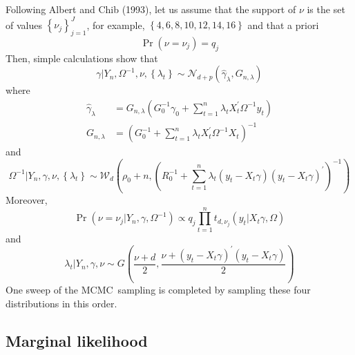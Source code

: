 \documentclass[12pt]{article}
\begin{document}
Following Albert and Chib (1993), let us assume that the support of $\nu $
is the set of values $\left\{ \nu _{j}\right\} _{j=1}^{J}$, for example, $%
\left\{ 4,6,8,10,12,14,16\right\} $ and that a priori
\begin{equation*}
\Pr \left( \nu =\nu _{j}\right) =q_{j}
\end{equation*}%
Then, simple calculations show that
\begin{equation*}
\gamma |Y_{n},\Omega ^{-1},\nu ,\left\{ \lambda _{t}\right\} \sim \mathcal{N}%
_{d+p}\left( \hat{\gamma}_{\lambda },G_{n,\lambda }\right)
\end{equation*}%
where
\begin{align*}
\hat{\gamma}_{\lambda }& =G_{n,\lambda }\left( G_{0}^{-1}\gamma
_{0}+\sum_{t=1}^{n}\lambda _{t}X_{t}^{\prime }\Omega ^{-1}y_{t}\right)  \\
G_{n,\lambda }& =\left( G_{0}^{-1}+\sum_{t=1}^{n}\lambda _{t}X_{t}^{\prime
}\Omega ^{-1}X_{t}\right) ^{-1}
\end{align*}%
and
\begin{equation*}
\Omega ^{-1}|Y_{n},\gamma ,\nu ,\left\{ \lambda _{t}\right\} \sim \mathcal{W}%
_{d}\left( \rho _{0}+n,\left( R_{0}^{-1}+\sum_{t=1}^{n}\lambda _{t}\left(
y_{t}-X_{t}\gamma \right) \left( y_{t}-X_{t}\gamma \right) ^{\prime }\right)
^{-1}\right)
\end{equation*}%
Moreover,%
\begin{equation*}
\Pr \left( \nu =\nu _{j}|Y_{n},\gamma ,\Omega ^{-1}\right) \propto
q_{j}\prod\limits_{t=1}^{n}t_{d,\nu _{j}}\left( y_{t}|X_{t}\gamma ,\Omega
\right)
\end{equation*}%
and%
\begin{equation*}
\lambda _{t}|Y_{n},\gamma ,\nu \sim G\left( \frac{\nu +d}{2},\frac{\nu
+\left( y_{t}-X_{t}\gamma \right) ^{\prime }\left( y_{t}-X_{t}\gamma \right)
}{2}\right)
\end{equation*}%
One sweep of the MCMC\ sampling is completed by sampling these four
distributions in this order.

\subsection{Marginal likelihood}
\end{document}
